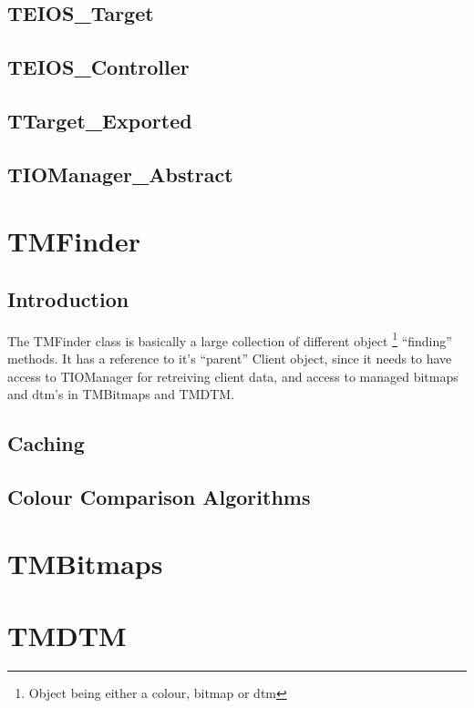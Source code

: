 \documentclass[a4paper, 10pt]{report} %
\begin{document}
\subsection{TEIOS\_Target}
\subsection{TEIOS\_Controller}
\subsection{TTarget\_Exported}
\subsection{TIOManager\_Abstract}

\section{TMFinder}

\subsection{Introduction}

The TMFinder class is basically a large collection of different object
\footnote{Object being either a colour, bitmap or dtm} ``finding'' methods.
It has a reference to it's ``parent'' Client object, since it needs to have
access to TIOManager for retreiving client data, and access to managed bitmaps
and dtm's in TMBitmaps and TMDTM.


\subsection{Caching}

\subsection{Colour Comparison Algorithms}



\section{TMBitmaps}

\section{TMDTM}
\end{document}
